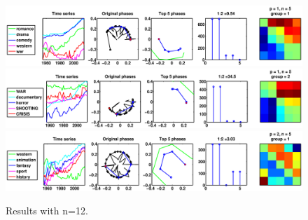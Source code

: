 \documentclass[11pt]{article}
\begin{document}
\begin{figure}[H]
\includegraphics[trim = 0 0 130 0, clip, width=\textwidth]{pictures/movie_word_data_1955-2015_p1_n5_gp1.eps}
\includegraphics[trim = 0 0 130 0, clip, width=\textwidth]{pictures/movie_word_data_1955-2015_p1_n5_gp2.eps}
\includegraphics[trim = 0 0 130 0, clip, width=\textwidth]{pictures/movie_word_data_1955-2015_p2_n5_gp1.eps}
\caption{Results with n=12.}
\end{figure}
\end{document}

